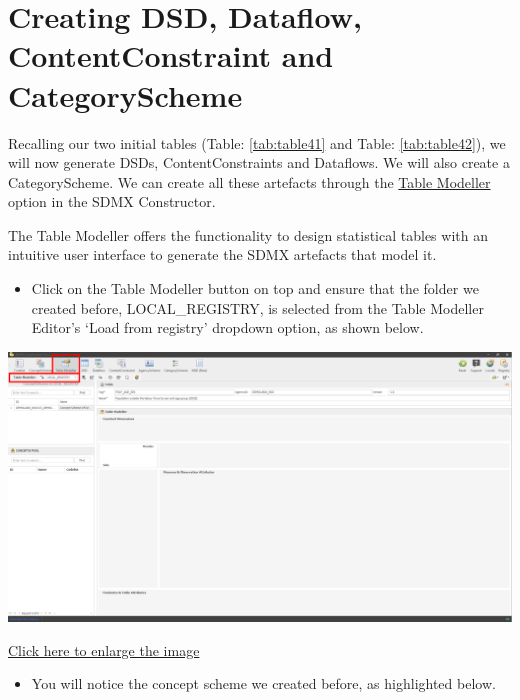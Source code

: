 \documentclass[
]{book}
\providecommand{\tightlist}{%
  \setlength{\itemsep}{0pt}\setlength{\parskip}{0pt}}
\begin{document}
\hypertarget{creating-dsd}{%
\section{Creating DSD, Dataflow, ContentConstraint and CategoryScheme}\label{creating-dsd}}

Recalling our two initial tables (Table: \ref{tab:table41} and Table: \ref{tab:table42}), we will now generate DSDs, ContentConstraints and Dataflows. We will also create a CategoryScheme. We can create all these artefacts through the \protect\hyperlink{table-modeller}{Table Modeller} option in the SDMX Constructor.

The Table Modeller offers the functionality to design statistical tables with an intuitive user interface to generate the SDMX artefacts that model it.

\begin{itemize}
\tightlist
\item
  Click on the Table Modeller button on top and ensure that the folder we created before, LOCAL\_REGISTRY, is selected from the Table Modeller Editor's `Load from registry' dropdown option, as shown below.
\end{itemize}

\begin{center}\includegraphics[width=1\linewidth]{./images/image130} \end{center}

\href{images/image130.png}{Click here to enlarge the image}

\begin{itemize}
\tightlist
\item
  You will notice the concept scheme we created before, as highlighted below.
\end{itemize}
\end{document}
